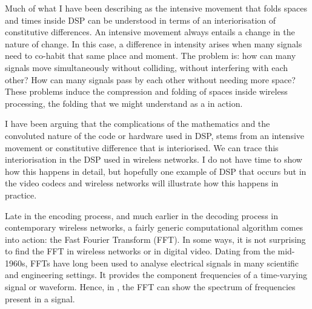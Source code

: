 Much of what I have been describing as the intensive movement that folds
spaces and times inside DSP can be understood in terms of an
interiorisation of constitutive differences. An intensive movement
always entails a change in the nature of change. In this case, a
difference in intensity arises when many signals need to co{}-habit
that same place and moment. The problem is: how can many signals move
simultaneously without colliding, without interfering with each other?
How can many signals pass by each other without needing more space?
These problems induce the compression and folding of spaces inside
wireless processing, the folding that we might understand as a  in action.


I have been arguing that the complications of the mathematics and the
convoluted nature of the code or hardware used in DSP, stems from an
intensive movement or constitutive difference that is interiorised. We
can trace this interiorisation in the DSP used in wireless networks. I
do not have time to show how this happens in detail, but hopefully one
example of DSP that occurs but in the video codecs and wireless
networks will illustrate how this happens in practice. 

Late in the encoding process, and much earlier in the decoding process
in contemporary wireless networks, a fairly generic computational
algorithm comes into action: the Fast Fourier Transform (FFT). In some
ways, it is not surprising to find the FFT in wireless networks or in
digital video. Dating from the mid{}-1960s, FFTs have long been used to
analyse electrical signals in many scientific and engineering settings.
It provides the component frequencies of a time{}-varying signal or
waveform. Hence, in , the FFT can show the spectrum
of frequencies present in a signal. 

